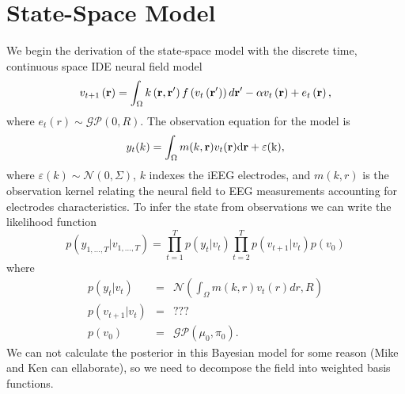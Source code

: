 \documentclass[onecolumn,draftcls]{IEEEtran}
\begin{document}
\section{State-Space Model}
We begin the derivation of the state-space model with the discrete time, continuous space IDE neural field model
\begin{equation}\label{SystemEq}
{v_{t + 1}}\left( {\bf{r}} \right) = \int_\Omega  {k\left( {{\bf{r}} , {\bf{r'}}} \right)f\left( {{v_t}\left( {{\bf{r'}}} \right)} \right)d{\bf{r'}}}  - \alpha {v_t}\left( {\bf{r}} \right) + e_t\left( {\mathbf{r}} \right),
\end{equation}
where $e_t(r)\sim \mathcal{GP}(0,R)$. The observation equation for the model is
\begin{equation}\label{ObservationEquation}
    y_t( k ) = \int_\Omega  m( k,\mathbf{r} )v_t( \mathbf{r}\rm ) d\mathbf{r}  + \varepsilon ( k ),
\end{equation}
where $\varepsilon( k )\sim\mathcal{N}(0,\Sigma)$, $k$ indexes the iEEG electrodes, and $m(k,r)$ is the observation kernel relating the neural field to EEG measurements accounting for electrodes characteristics.
To infer the state from observations we can write the likelihood function
\begin{equation}\label{Likelihood}
p\left( {{y_{1,...,T}}|{v_{1,...,T}}} \right) = \prod\limits_{t = 1}^T {p\left( {{y_t}|{v_t}} \right)} \prod\limits_{t = 2}^T {p\left( {{v_{t + 1}}|{v_t}} \right)} p\left( {{v_0}} \right)
\end{equation}
where
\begin{eqnarray}
  p\left( {{y_t}|{v_t}} \right) &=& \mathcal{N}\left( {\int_\Omega  {m\left( {k,r} \right)v_t( r )dr} ,R} \right) \\
  p\left( {{v_{t + 1}}|{v_t}} \right) &=& ??? \\
  p\left( {{v_0}} \right) &=& \mathcal{GP}\left( {{\mu _0},{\pi _0}} \right).
\end{eqnarray}
We can not calculate the posterior in this Bayesian model for some reason (Mike and Ken can ellaborate), so we need to decompose the field into weighted basis functions.
\end{document}
